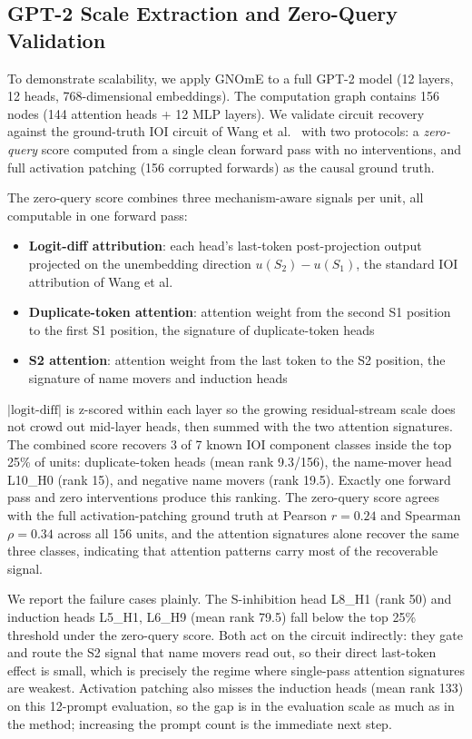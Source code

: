 \documentclass[11pt,a4paper]{article}
\begin{document}
\subsection{GPT-2 Scale Extraction and Zero-Query Validation}

To demonstrate scalability, we apply GNOmE to a full GPT-2 model (12 layers, 12 heads, 768-dimensional embeddings). The computation graph contains 156 nodes (144 attention heads + 12 MLP layers). We validate circuit recovery against the ground-truth IOI circuit of Wang et al.\ \cite{wang2023interpretability} with two protocols: a \emph{zero-query} score computed from a single clean forward pass with no interventions, and full activation patching (156 corrupted forwards) as the causal ground truth.

The zero-query score combines three mechanism-aware signals per unit, all computable in one forward pass:
\begin{itemize}[leftmargin=*]
    \item \textbf{Logit-diff attribution}: each head's last-token post-projection output projected on the unembedding direction $u(S_2) - u(S_1)$, the standard IOI attribution of Wang et al.
    \item \textbf{Duplicate-token attention}: attention weight from the second S1 position to the first S1 position, the signature of duplicate-token heads
    \item \textbf{S2 attention}: attention weight from the last token to the S2 position, the signature of name movers and induction heads
\end{itemize}

$|\text{logit-diff}|$ is z-scored within each layer so the growing residual-stream scale does not crowd out mid-layer heads, then summed with the two attention signatures. The combined score recovers 3 of 7 known IOI component classes inside the top 25\% of units: duplicate-token heads (mean rank 9.3/156), the name-mover head L10\_H0 (rank 15), and negative name movers (rank 19.5). Exactly one forward pass and zero interventions produce this ranking. The zero-query score agrees with the full activation-patching ground truth at Pearson $r = 0.24$ and Spearman $\rho = 0.34$ across all 156 units, and the attention signatures alone recover the same three classes, indicating that attention patterns carry most of the recoverable signal.

We report the failure cases plainly. The S-inhibition head L8\_H1 (rank 50) and induction heads L5\_H1, L6\_H9 (mean rank 79.5) fall below the top 25\% threshold under the zero-query score. Both act on the circuit indirectly: they gate and route the S2 signal that name movers read out, so their direct last-token effect is small, which is precisely the regime where single-pass attention signatures are weakest. Activation patching also misses the induction heads (mean rank 133) on this 12-prompt evaluation, so the gap is in the evaluation scale as much as in the method; increasing the prompt count is the immediate next step.
\end{document}
